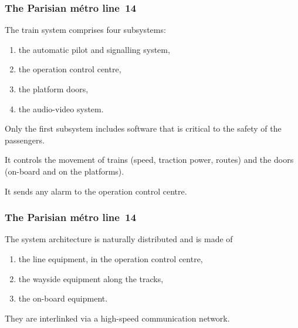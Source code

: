 \documentclass[compress,dvipdfmx]{beamer}
\begin{document}
\begin{frame}
  \frametitle{The Parisian métro line~14}

  The train system comprises four subsystems:
  \begin{enumerate}
    \item the automatic pilot and signalling system,

    \item the operation control centre,

    \item the platform doors,

    \item the audio-video system.
  \end{enumerate}

  \bigskip

  Only the first  subsystem includes software that is  critical to the
  safety of the passengers.

  \bigskip

  It controls the movement of trains (speed, traction power, routes)
  and the doors (on\hyp{}board and on the platforms).

  \bigskip

  It sends any alarm to the operation control centre.

\end{frame}


\begin{frame}
  \frametitle{The Parisian métro line~14}

  The system architecture is naturally distributed and is made of
  \begin{enumerate}

    \item the line equipment, in the operation control centre,

    \item the wayside equipment along the tracks,

    \item the on\hyp{}board equipment.

  \end{enumerate}

  \bigskip

  They are interlinked via a high\hyp{}speed communication network.

\end{frame}
\end{document}
